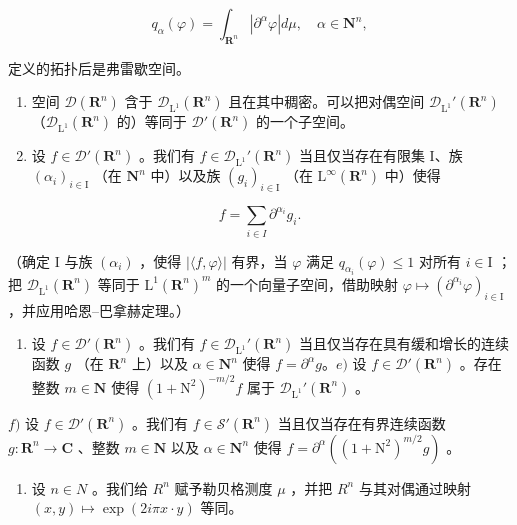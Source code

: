 \[
q _ {\alpha} (\varphi) = \int_ {\mathbf {R} ^ {n}} | \partial^ {\alpha} \varphi | d \mu , \quad \alpha \in \mathbf {N} ^ {n},
\]

定义的拓扑后是弗雷歇空间。

\begin{enumerate}
\def\labelenumi{\alph{enumi})}
\setcounter{enumi}{1}
\item
  空间 \(\mathcal{D}(\mathbf{R}^n)\) 含于 \(\mathcal{D}_{\mathrm{L}^1}(\mathbf{R}^n)\) 且在其中稠密。可以把对偶空间 \(\mathcal{D}_{\mathrm{L}^1}'(\mathbf{R}^n)\) （\(\mathcal{D}_{\mathrm{L}^1}(\mathbf{R}^n)\) 的）等同于 \(\mathcal{D}'(\mathbf{R}^n)\) 的一个子空间。
\item
  设 \(f \in \mathcal{D}'(\mathbf{R}^n)\) 。我们有 \(f \in \mathcal{D}_{\mathrm{L}^1}'(\mathbf{R}^n)\) 当且仅当存在有限集 I、族 \((\alpha_i)_{i \in \mathrm{I}}\) （在 \(\mathbf{N}^n\) 中）以及族 \((g_i)_{i \in \mathrm{I}}\) （在 \(\mathrm{L}^\infty(\mathbf{R}^n)\) 中）使得
\end{enumerate}

\[
f = \sum_ {i \in I} \partial^ {\alpha_ {i}} g _ {i}.
\]

（确定 I 与族 \((\alpha_{i})\) ，使得 \(|\langle f,\varphi\rangle |\) 有界，当 \(\varphi\) 满足 \(q_{\alpha_i}(\varphi)\leqslant 1\) 对所有 \(i\in \mathrm{I}\) ；把 \(\mathcal{D}_{\mathrm{L}^1}(\mathbf{R}^n)\) 等同于 \(\mathrm{L}^1 (\mathbf{R}^n)^m\) 的一个向量子空间，借助映射 \(\varphi \mapsto (\partial^{\alpha_i}\varphi)_{i\in \mathrm{I}}\) ，并应用哈恩–巴拿赫定理。）

\begin{enumerate}
\def\labelenumi{\alph{enumi})}
\setcounter{enumi}{3}
\tightlist
\item
  设 \(f \in \mathcal{D}'(\mathbf{R}^n)\) 。我们有 \(f \in \mathcal{D}_{\mathrm{L}^1}'(\mathbf{R}^n)\) 当且仅当存在具有缓和增长的连续函数 \(g\) （在 \(\mathbf{R}^n\) 上）以及 \(\alpha \in \mathbf{N}^n\) 使得 \(f = \partial^\alpha g\)。\(e)\) 设 \(f \in \mathcal{D}'(\mathbf{R}^n)\) 。存在整数 \(m \in \mathbf{N}\) 使得 \((1 + \mathrm{N}^2)^{-m/2}f\) 属于 \(\mathcal{D}_{\mathrm{L}^1}'(\mathbf{R}^n)\) 。
\end{enumerate}

\(f)\) 设 \(f \in \mathcal{D}'(\mathbf{R}^n)\) 。我们有 \(f \in \mathcal{S}'(\mathbf{R}^n)\) 当且仅当存在有界连续函数 \(g\colon \mathbf{R}^n \to \mathbf{C}\) 、整数 \(m \in \mathbf{N}\) 以及 \(\alpha \in \mathbf{N}^n\) 使得 \(f = \partial^\alpha((1 + \mathrm{N}^2)^{m/2}g)\) 。

\begin{enumerate}
\def\labelenumi{\arabic{enumi})}
\setcounter{enumi}{25}
\tightlist
\item
  设 \(n \in N\) 。我们给 \(R^{n}\) 赋予勒贝格测度 \(\mu\) ，并把 \(R^{n}\) 与其对偶通过映射 \((x, y) \mapsto \exp(2i\pi x \cdot y)\) 等同。
\end{enumerate}

